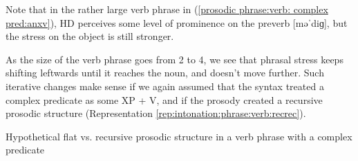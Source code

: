 Note that   in the rather large verb phrase in (\ref{prosodic phrase:verb: complex pred:anxv}), HD perceives some level of prominence on the preverb [məˈdiɡ], but the stress on the object is still stronger. 

As the size of the verb phrase goes from 2 to 4, we see that phrasal stress keeps shifting leftwards until it reaches the noun, and doesn't move further. Such iterative changes make sense if we again assumed that the syntax treated a complex predicate as some XP + V, and if the prosody created a recursive prosodic structure (Representation \ref{rep:intonation:phrase:verb:recrec}). 

\begin{representation}
	Hypothetical flat vs. recursive prosodic structure in a verb phrase with a complex predicate \label{rep:intonation:phrase:verb:recrec}
	

\end{representation}
